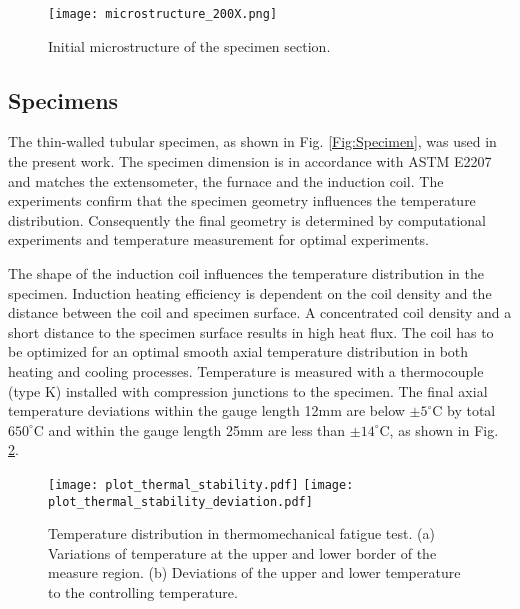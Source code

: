\documentclass[preprint,5p,twocolumn,11pt,sort&compress]{elsarticle}
\begin{document}
\begin{figure}[!htp]
\centering
\texttt{[image: microstructure\_200X.png]}
\caption{Initial microstructure of the specimen section.}
\label{Fig:microstructure_200X}
\end{figure}

\begin{figure*}[!htp]
\caption{Geometry of the specimens investigated in the present work.}
\label{Fig:Specimen}
\end{figure*}

\subsection{Specimens}
The thin-walled tubular specimen, as shown in Fig. \ref{Fig:Specimen}, was used in the present work. The specimen dimension is in accordance with ASTM E2207 \cite{ASTM2014} and matches the extensometer, the furnace and the induction coil. The experiments confirm that the specimen geometry influences the temperature distribution. Consequently the final geometry is determined by computational experiments and temperature measurement for optimal experiments.

The shape of the induction coil influences the temperature distribution in the specimen. Induction heating efficiency is dependent on the coil density and the distance between the coil and specimen surface. A concentrated coil density and a short distance to the specimen surface results in high heat flux. The coil has to be optimized for an optimal smooth axial temperature distribution in both heating and cooling processes. Temperature is measured with a thermocouple (type K) installed with compression junctions to the specimen. The final axial temperature deviations within the gauge length 12mm are below $\pm5^\circ$C by total $650^\circ$C and within the gauge length 25mm are less than $\pm14^\circ$C, as shown in Fig. \ref{Fig:Temp-Distr}.


\begin{figure}[!htp]
\texttt{[image: plot\_thermal\_stability.pdf]}
\texttt{[image: plot\_thermal\_stability\_deviation.pdf]}
\caption{Temperature distribution in thermomechanical fatigue test. (a) Variations of temperature at the upper and lower border of the measure region. (b) Deviations of the upper and lower temperature to the controlling temperature.}
\label{Fig:Temp-Distr}
\end{figure}
\end{document}
